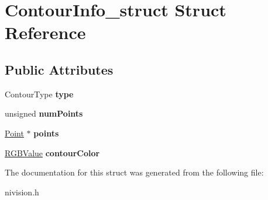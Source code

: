 \hypertarget{structContourInfo__struct}{\section{\-Contour\-Info\-\_\-struct \-Struct \-Reference}
\label{structContourInfo__struct}
}
\subsection*{\-Public \-Attributes}
\begin{DoxyCompactItemize}
\item 
\hypertarget{structContourInfo__struct_a4e5d54f3f19f4708e48a184bc7c02e88}{\-Contour\-Type {\bfseries type}}\label{structContourInfo__struct_a4e5d54f3f19f4708e48a184bc7c02e88}

\item 
\hypertarget{structContourInfo__struct_a556d3678b4bb38d8ecf36902771fca13}{unsigned {\bfseries num\-Points}}\label{structContourInfo__struct_a556d3678b4bb38d8ecf36902771fca13}

\item 
\hypertarget{structContourInfo__struct_a7742d639845853f6d002101c388b4b20}{\hyperlink{structPoint__struct}{\-Point} $\ast$ {\bfseries points}}\label{structContourInfo__struct_a7742d639845853f6d002101c388b4b20}

\item 
\hypertarget{structContourInfo__struct_a557f1cb60d84b5a3a860a3bc75f79d90}{\hyperlink{structRGBValue__struct}{\-R\-G\-B\-Value} {\bfseries contour\-Color}}\label{structContourInfo__struct_a557f1cb60d84b5a3a860a3bc75f79d90}

\end{DoxyCompactItemize}


\-The documentation for this struct was generated from the following file\-:\begin{DoxyCompactItemize}
\item 
nivision.\-h\end{DoxyCompactItemize}
